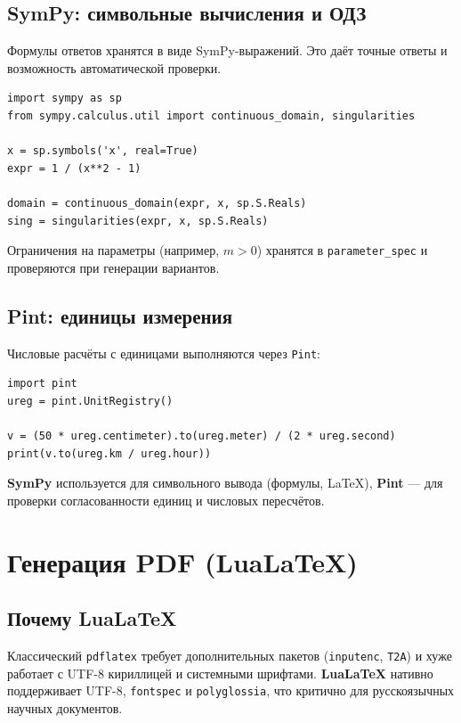 \documentclass[12pt,a4paper]{article}
\newcommand{\code}[1]{\texttt{#1}}
\begin{document}
\subsection{SymPy: символьные вычисления и ОДЗ}

Формулы ответов хранятся в виде SymPy-выражений. Это даёт
точные ответы и возможность автоматической проверки.

\begin{verbatim}
import sympy as sp
from sympy.calculus.util import continuous_domain, singularities

x = sp.symbols('x', real=True)
expr = 1 / (x**2 - 1)

domain = continuous_domain(expr, x, sp.S.Reals)
sing = singularities(expr, x, sp.S.Reals)
\end{verbatim}

\noindent
Ограничения на параметры (например, \(m > 0\)) хранятся в
\code{parameter\_spec} и проверяются при генерации вариантов.

\subsection{Pint: единицы измерения}

Числовые расчёты с единицами выполняются через \code{Pint}:

\begin{verbatim}
import pint
ureg = pint.UnitRegistry()

v = (50 * ureg.centimeter).to(ureg.meter) / (2 * ureg.second)
print(v.to(ureg.km / ureg.hour))
\end{verbatim}

\noindent
\textbf{SymPy} используется для символьного вывода (формулы, LaTeX),
\textbf{Pint} --- для проверки согласованности единиц и числовых
пересчётов.

\section{Генерация PDF (LuaLaTeX)}

\subsection{Почему LuaLaTeX}

Классический \code{pdflatex} требует дополнительных пакетов
(\code{inputenc}, \code{T2A}) и хуже работает с UTF-8 кириллицей
и системными шрифтами. \textbf{LuaLaTeX} нативно поддерживает UTF-8,
\code{fontspec} и \code{polyglossia}, что критично для русскоязычных
научных документов.
\end{document}

